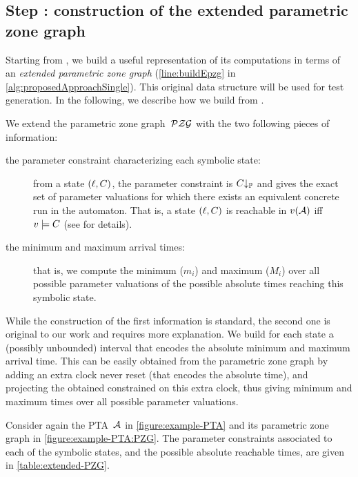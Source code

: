 \begin{tikzborder}{\cite{Gargantini16:validation}}
\begin{tikzborder}{\cite{gargantini_combinatorial_2017}}
\begin{tikzborder}{\cite{garn2019}}
\begin{tikzborder}{\cite{arcaini2019achieving}}
\begin{tikzborder}{\cite{arcaini2019varivolution}}
\subsection{Step : construction of the extended parametric zone graph}
\begin{tikzborder}{}
Starting from \ptaProc, we build a useful representation of its computations in terms of an {\it extended parametric zone graph} \epzg (\ref{line:buildEpzg} in \ref{alg:proposedApproachSingle}).
This original data structure will be used for test generation.
In the following, we describe how we build \epzg from \PZG.

We extend the parametric zone graph~$\mathcal{PZG}$ with the two following pieces of information:
\begin{description}
	\item[the parameter constraint characterizing each symbolic state:] from a state $(\ell, C)$, the parameter constraint is $C{\downarrow_{\mathbb{P}}}$ and gives the exact set of parameter valuations for which there exists an equivalent concrete run in the automaton. That is, a state $(\ell, C)$ is reachable in $v(\mathcal{A})$ iff $v \models C$ (see \cite{JLR15} for details).
	\item[the minimum and maximum arrival times:] that is, we compute the minimum ($m_i$) and maximum ($M_i$) over all possible parameter valuations of the possible absolute times reaching this symbolic state.
\end{description}
While the construction of the first information is standard, the second one is original to our work and requires more explanation.
We build for each state a (possibly unbounded) interval that encodes the absolute minimum and maximum arrival time.
This can be easily obtained from the parametric zone graph by adding an extra clock never reset (that encodes the absolute time), and projecting the obtained constrained on this extra clock, thus giving minimum and maximum times over all possible parameter valuations.

\begin{example}\label{example:structure}
	Consider again the PTA~$\mathcal{A}$ in \ref{figure:example-PTA} and its parametric zone graph in \ref{figure:example-PTA:PZG}. The parameter constraints associated to each of the symbolic states, and the possible absolute reachable times, are given in \ref{table:extended-PZG}.
	
	\begin{figure}[tb]
		

\end{figure}
\end{example}
\end{tikzborder}
\end{tikzborder}
\end{tikzborder}
\end{tikzborder}
\end{tikzborder}
\end{tikzborder}
